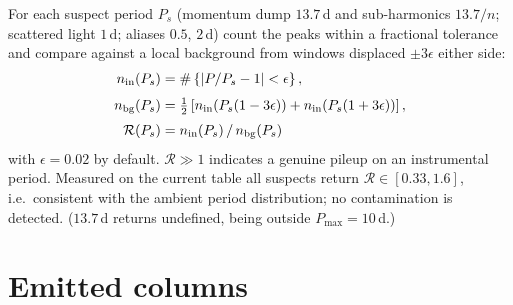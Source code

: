 \documentclass[11pt]{article}
\begin{document}
For each suspect period $P_s$ (momentum dump $13.7$\,d and sub-harmonics
$13.7/n$; scattered light $1$\,d; aliases $0.5$, $2$\,d) count the peaks within a
fractional tolerance and compare against a local background from windows displaced
$\pm 3\epsilon$ either side:
%
\begin{align}
  n_{\rm in}(P_s) &= \#\left\{ \left| P/P_s - 1 \right| < \epsilon \right\},
  \label{eq:harmin}\\[3pt]
  n_{\rm bg}(P_s) &= \tfrac{1}{2}\left[
      n_{\rm in}\!\left(P_s(1-3\epsilon)\right) + n_{\rm in}\!\left(P_s(1+3\epsilon)\right)
    \right],
  \label{eq:harmbg}\\[3pt]
  \mathcal{R}(P_s) &= n_{\rm in}(P_s) \,/\, n_{\rm bg}(P_s)
  \label{eq:harmratio}
\end{align}
%
with $\epsilon = 0.02$ by default. $\mathcal{R} \gg 1$ indicates a genuine pileup on an
instrumental period. Measured on the current table all suspects return
$\mathcal{R} \in [0.33, 1.6]$, i.e.\ consistent with the ambient period distribution; no
contamination is detected. ($13.7$\,d returns undefined, being outside
$P_{\max} = 10$\,d.)

\section{Emitted columns}
\end{document}
